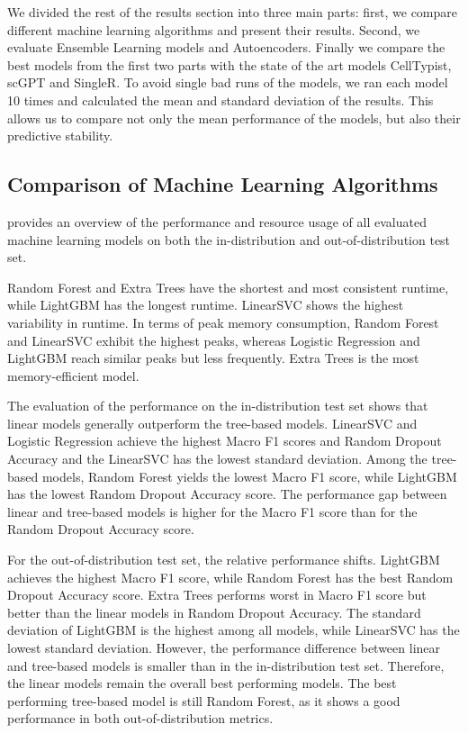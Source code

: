 \documentclass[11pt]{article}
\begin{document}

We divided the rest of the results section into three main parts: first, we compare different machine learning algorithms and present their results. Second, we evaluate Ensemble Learning models and Autoencoders. Finally we compare the best models from the first two parts with the state of the art models CellTypist, scGPT and SingleR.
To avoid single bad runs of the models, we ran each model 10 times and calculated the mean and standard deviation of the results. This allows us to compare not only the mean performance of the models, but also their predictive stability.

\subsection{Comparison of Machine Learning Algorithms}\label{sec:results:ml}

 provides an overview of the performance and resource usage of all evaluated machine learning models on both the in-distribution and out-of-distribution test set.

Random Forest and Extra Trees have the shortest and most consistent runtime, while LightGBM has the longest runtime. LinearSVC shows the highest variability in runtime. In terms of peak memory consumption, Random Forest and LinearSVC exhibit the highest peaks, whereas Logistic Regression and LightGBM reach similar peaks but less frequently. Extra Trees is the most memory-efficient model. %

The evaluation of the performance on the in-distribution test set shows that linear models generally outperform the tree-based models. LinearSVC and Logistic Regression achieve the highest Macro F1 scores and Random Dropout Accuracy and the LinearSVC has the lowest standard deviation. Among the tree-based models, Random Forest yields the lowest Macro F1 score, while LightGBM has the lowest Random Dropout Accuracy score. The performance gap between linear and tree-based models is higher for the Macro F1 score than for the Random Dropout Accuracy score.

For the out-of-distribution test set, the relative performance shifts. LightGBM achieves the highest Macro F1 score, while Random Forest has the best Random Dropout Accuracy score. Extra Trees performs worst in Macro F1 score but better than the linear models in Random Dropout Accuracy. The standard deviation of LightGBM is the highest among all models, while LinearSVC has the lowest standard deviation. However, the performance difference between linear and tree-based models is smaller than in the in-distribution test set. Therefore, the linear models remain the overall best performing models. The best performing tree-based model is still Random Forest, as it shows a good performance in both out-of-distribution metrics.
\end{document}
